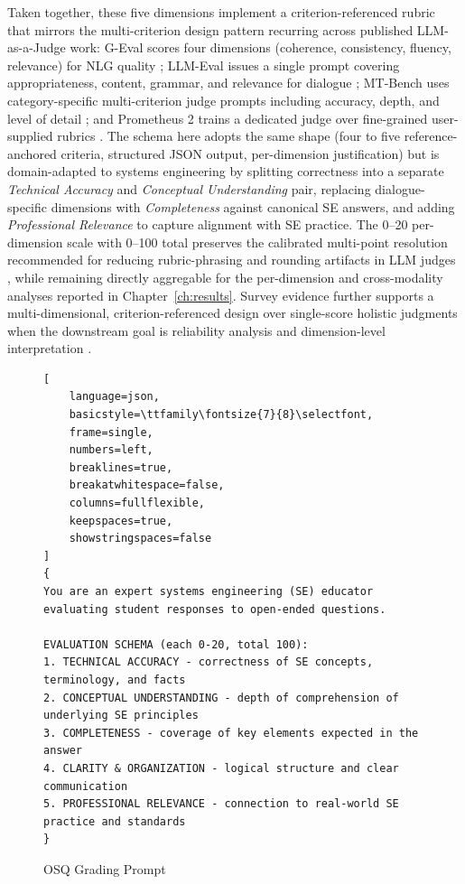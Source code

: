 Taken together, these five dimensions implement a criterion-referenced rubric that mirrors the multi-criterion design pattern recurring across published LLM-as-a-Judge work: G-Eval scores four dimensions (coherence, consistency, fluency, relevance) for NLG quality \cite{liu_GEvalNLGEvaluationUsing_2023}; LLM-Eval issues a single prompt covering appropriateness, content, grammar, and relevance for dialogue \cite{lin_LLMEvalUnifiedMultiDimensionalAutomatic_2023}; MT-Bench uses category-specific multi-criterion judge prompts including accuracy, depth, and level of detail \cite{zheng_JudgingLLMasaJudgeMTBench_2023}; and Prometheus 2 trains a dedicated judge over fine-grained user-supplied rubrics \cite{kim2024prometheus}. The schema here adopts the same shape (four to five reference-anchored criteria, structured JSON output, per-dimension justification) but is domain-adapted to systems engineering by splitting correctness into a separate \emph{Technical Accuracy} and \emph{Conceptual Understanding} pair, replacing dialogue-specific dimensions with \emph{Completeness} against canonical SE answers, and adding \emph{Professional Relevance} to capture alignment with SE practice. The 0--20 per-dimension scale with 0--100 total preserves the calibrated multi-point resolution recommended for reducing rubric-phrasing and rounding artifacts in LLM judges \cite{liu_GEvalNLGEvaluationUsing_2023, zhouMitigatingBiasLarge2024}, while remaining directly aggregable for the per-dimension and cross-modality analyses reported in Chapter~\ref{ch:results}. Survey evidence further supports a multi-dimensional, criterion-referenced design over single-score holistic judgments when the downstream goal is reliability analysis and dimension-level interpretation \cite{gu_survey_on_llm_as_a_judge_2025, thakurJudgingJudgesEvaluating2025}.


\begin{figure}[htbp]
\centering
\begin{scriptsize}
\begin{lstlisting}[
    language=json,
    basicstyle=\ttfamily\fontsize{7}{8}\selectfont,
    frame=single,
    numbers=left,
    breaklines=true,
    breakatwhitespace=false,
    columns=fullflexible,
    keepspaces=true,
    showstringspaces=false
]
{
You are an expert systems engineering (SE) educator evaluating student responses to open-ended questions.

EVALUATION SCHEMA (each 0-20, total 100):
1. TECHNICAL ACCURACY - correctness of SE concepts, terminology, and facts
2. CONCEPTUAL UNDERSTANDING - depth of comprehension of underlying SE principles
3. COMPLETENESS - coverage of key elements expected in the answer
4. CLARITY & ORGANIZATION - logical structure and clear communication
5. PROFESSIONAL RELEVANCE - connection to real-world SE practice and standards
}
\end{lstlisting}
\end{scriptsize}
\caption{OSQ Grading Prompt}
\label{lst:osq-grading-prompt}
\end{figure}


